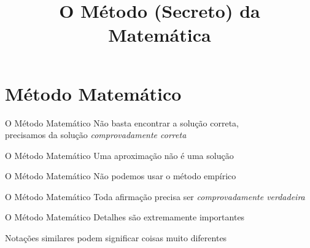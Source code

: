 \documentclass[fleqn,utf8,aspectratio=169,12pt]{beamer}
\title{O Método (Secreto) da Matemática}
\begin{document}
\addtitle

\section{Método Matemático}

\begin{frame}{O Método Matemático}
  Não basta encontrar a solução correta, \\[2mm]
  precisamos da solução \emph{comprovadamente correta}
\end{frame}

\begin{frame}{O Método Matemático}
  Uma aproximação não é uma solução
\end{frame}

\begin{frame}{O Método Matemático}
  Não podemos usar o método empírico
\end{frame}

\begin{frame}{O Método Matemático}
  Toda afirmação precisa ser \emph{comprovadamente verdadeira}
\end{frame}

\begin{frame}{O Método Matemático}
  Detalhes são extremamente importantes

  \pause
  Notações similares podem significar coisas muito diferentes
\end{frame}
\end{document}
